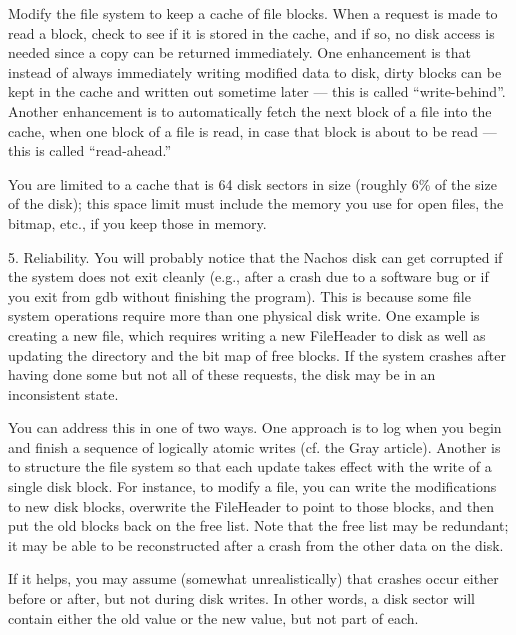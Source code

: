 \begin{description}
\begin{description}
\item Modify the file system to keep a cache of file blocks.  
When a request is made to read a block, check to see if it is stored 
in the cache, and 
if so, no disk access is needed since a copy can be returned immediately.
One enhancement is that instead of always immediately writing modified 
data to disk, dirty blocks can be kept in the cache and written out 
sometime later --- this is called ``write-behind''.
Another enhancement is to
automatically fetch the next block of a file into the cache, when one 
block of a file is read, in case that block is about to be read ---
this is called ``read-ahead.''

You are limited to a cache that is 64 disk sectors in size (roughly 6\%
of the size of the disk); this space limit must include the memory you
use for open files, the bitmap, etc., if you keep those in memory.

\end{description}
\end{description}


\item{5.}
Reliability.  You will probably notice that the Nachos disk can get
corrupted if the system does not exit cleanly (e.g., after a crash due
to a software bug or if you exit from gdb without finishing the program).
This is because some file system operations require more than one
physical disk write.  One example is creating a new file, which requires
writing a new FileHeader to disk as well as updating the directory 
and the bit map of free blocks.  If the system crashes after having
done some but not all of these requests, the disk may be in an inconsistent
state.

You can address this in one of two ways.  One approach is to 
log when you begin and finish a sequence of logically atomic 
writes (cf. the Gray article).  Another is to structure the file
system so that each update takes effect with the write of a single disk block.
For instance, to modify a file, you can write the modifications
to new disk blocks, overwrite the FileHeader to point to those blocks,
and then put the old blocks back on the free list.  Note that
the free list may be redundant; it may be able to be reconstructed after
a crash from the other data on the disk.  

If it helps, you may assume (somewhat unrealistically) that crashes occur 
either before or after, but not during disk writes.  In other
words, a disk sector will contain either the old value or the new
value, but not part of each.

